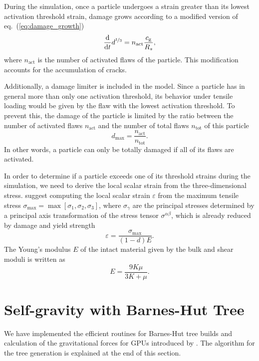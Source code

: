 \documentclass[10pt,fleqn,twoside]{article}
\begin{document}
During the simulation, once a particle undergoes a strain greater than its lowest activation threshold strain, damage
grows according to a modified version of eq.~(\ref{eq:damage_growth})
%
\begin{equation}
 \frac{\mathrm{d}}{\mathrm{d} t} d^{\nicefrac{1}{3}} = n_\mathrm{act} \frac{c_\mathrm{g}}{R_s},
\end{equation}
%
where $n_\mathrm{act}$ is the number of activated flaws of the particle. This modification accounts for the accumulation
of cracks.

Additionally, a damage limiter is included in the model. Since a particle has in general more than only one activation
threshold, its behavior under tensile loading would be given by the flaw with the lowest activation threshold.  To
prevent this, the damage of the particle is limited by the ratio between the number of activated flaws $n_\mathrm{act}$
and the number of total flaws $n_\mathrm{tot}$ of this particle
%
\begin{equation}
 d_\mathrm{max} = \frac{n_\mathrm{act}}{n_\mathrm{tot}}.
\end{equation}
%
In other words, a particle can only be totally damaged if all of its flaws are activated.

In order to determine if a particle exceeds one of its threshold strains during the simulation, we need to derive the
local scalar strain from the three-dimensional stress. \cite{benz:1995} suggest computing the local scalar strain
$\varepsilon$ from the maximum tensile stress $\sigma_\mathrm{max} = \max [\sigma_1, \sigma_2, \sigma_3 ]$, where
$\sigma_\gamma$ are the principal stresses determined by a principal axis transformation of the stress tensor
$\sigma^{\alpha \beta}$, which is already reduced by damage and yield strength
%
\begin{equation}
 \varepsilon = \frac{\sigma_\mathrm{max}}{(1-d) E}.
\end{equation}
The Young's modulus $E$ of the intact material given by the bulk and shear moduli is written as
\begin{equation}
 E = \frac{9 K \mu}{3K+\mu}.
\end{equation}
%
%
\section{Self-gravity with Barnes-Hut Tree}
\label{section:self-gravity}
%
We have implemented the efficient routines for Barnes-Hut tree builds and calculation of the gravitational forces for GPUs introduced by \cite{burtscher:2011}. The algorithm
for the tree generation is explained at the end of this section.
\end{document}
